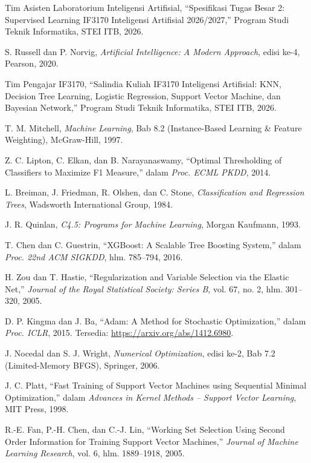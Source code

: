 \documentclass[11pt,a4paper]{article}
\numberwithin{figure}{section}
\numberwithin{table}{section}
\begin{document}
\begin{enumerate}[label={[\arabic*]}, leftmargin=*, align=left, itemsep=4pt]
  \item Tim Asisten Laboratorium Inteligensi Artifisial, ``Spesifikasi Tugas Besar 2: Supervised Learning IF3170 Inteligensi Artifisial 2026/2027,'' Program Studi Teknik Informatika, STEI ITB, 2026.
  \item S. Russell dan P. Norvig, \textit{Artificial Intelligence: A Modern Approach}, edisi ke-4, Pearson, 2020.
  \item Tim Pengajar IF3170, ``Salindia Kuliah IF3170 Inteligensi Artifisial: KNN, Decision Tree Learning, Logistic Regression, Support Vector Machine, dan Bayesian Network,'' Program Studi Teknik Informatika, STEI ITB, 2026.
  \item T. M. Mitchell, \textit{Machine Learning}, Bab 8.2 (Instance-Based Learning \& Feature Weighting), McGraw-Hill, 1997.
  \item Z. C. Lipton, C. Elkan, dan B. Narayanaswamy, ``Optimal Thresholding of Classifiers to Maximize F1 Measure,'' dalam \textit{Proc. ECML PKDD}, 2014.
  \item L. Breiman, J. Friedman, R. Olshen, dan C. Stone, \textit{Classification and Regression Trees}, Wadsworth International Group, 1984.
  \item J. R. Quinlan, \textit{C4.5: Programs for Machine Learning}, Morgan Kaufmann, 1993.
  \item T. Chen dan C. Guestrin, ``XGBoost: A Scalable Tree Boosting System,'' dalam \textit{Proc. 22nd ACM SIGKDD}, hlm. 785--794, 2016.
  \item H. Zou dan T. Hastie, ``Regularization and Variable Selection via the Elastic Net,'' \textit{Journal of the Royal Statistical Society: Series B}, vol. 67, no. 2, hlm. 301--320, 2005.
  \item D. P. Kingma dan J. Ba, ``Adam: A Method for Stochastic Optimization,'' dalam \textit{Proc. ICLR}, 2015. Tersedia: \url{https://arxiv.org/abs/1412.6980}.
  \item J. Nocedal dan S. J. Wright, \textit{Numerical Optimization}, edisi ke-2, Bab 7.2 (Limited-Memory BFGS), Springer, 2006.
  \item J. C. Platt, ``Fast Training of Support Vector Machines using Sequential Minimal Optimization,'' dalam \textit{Advances in Kernel Methods -- Support Vector Learning}, MIT Press, 1998.
  \item R.-E. Fan, P.-H. Chen, dan C.-J. Lin, ``Working Set Selection Using Second Order Information for Training Support Vector Machines,'' \textit{Journal of Machine Learning Research}, vol. 6, hlm. 1889--1918, 2005.

\end{enumerate}
\end{document}
